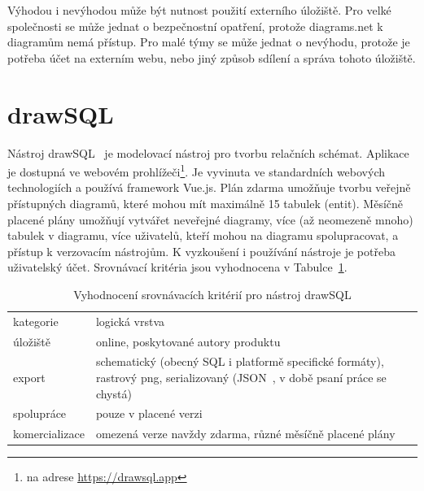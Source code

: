 Výhodou i nevýhodou může být nutnost použití externího úložiště.
Pro velké společnosti se může jednat o bezpečnostní opatření, protože diagrams.net k diagramům nemá přístup.
Pro malé týmy se může jednat o nevýhodu, protože je potřeba účet na externím webu, nebo jiný způsob sdílení a správa tohoto úložiště.

\section{drawSQL}

Nástroj drawSQL~\cite{drawsql_2021} je modelovací nástroj pro tvorbu relačních schémat.
Aplikace je dostupná ve webovém prohlížeči\footnote{na adrese \url{https://drawsql.app}}.
Je vyvinuta ve standardních webových technologiích a používá framework Vue.js.
Plán zdarma umožňuje tvorbu veřejně přístupných diagramů, které mohou mít maximálně 15 tabulek (entit).
Měsíčně placené plány umožňují vytvářet neveřejné diagramy, více (až neomezeně mnoho) tabulek v diagramu, více uživatelů, kteří mohou na diagramu spolupracovat, a přístup k verzovacím nástrojům.
K vyzkoušení i používání nástroje je potřeba uživatelský účet.
Srovnávací kritéria jsou vyhodnocena v Tabulce~\ref{tab:comparison-drawsql}.

\begin{table}[!htb]
  \begin{tabularx}{\textwidth}{lX}\toprule
    kategorie      & logická vrstva                                                                                                                                                      \\
    úložiště       & online, poskytované autory produktu                                                                                                                                 \\
    export         & schematický (obecný SQL i platformě specifické formáty), rastrový \acrshort{png}, serializovaný (JSON~\cite{tc39group_jsondata_2017}, v době psaní práce se chystá) \\
    spolupráce     & pouze v placené verzi                                                                                                                                               \\
    komercializace & omezená verze navždy zdarma, různé měsíčně placené plány                                                                                                            \\\bottomrule
  \end{tabularx}
  \caption{Vyhodnocení srovnávacích kritérií pro nástroj drawSQL}
  \label{tab:comparison-drawsql}
\end{table}

